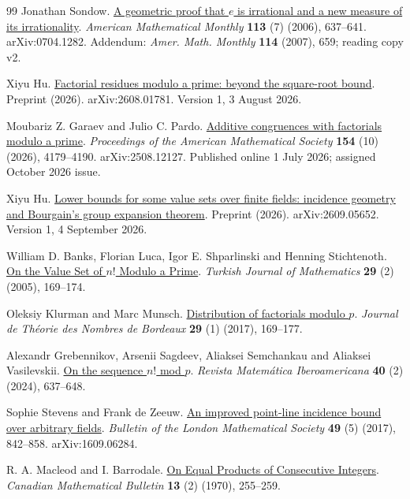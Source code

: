 \documentclass[11pt]{article}
\begin{document}
\begin{thebibliography}{99}
Jonathan Sondow. \href{https://arxiv.org/abs/0704.1282v2}{A geometric proof that {$e$} is irrational and a new measure of its irrationality}.
\emph{American Mathematical Monthly} \textbf{113} (7) (2006), 637--641. arXiv:0704.1282. Addendum: \emph{Amer. Math. Monthly} \textbf{114} (2007), 659; reading copy v2.

Xiyu Hu. \href{https://arxiv.org/abs/2608.01781v1}{Factorial residues modulo a prime: beyond the square-root bound}.
Preprint (2026). arXiv:2608.01781. Version 1, 3 August 2026.

Moubariz Z. Garaev and Julio C. Pardo. \href{https://doi.org/10.1090/proc/17753}{Additive congruences with factorials modulo a prime}.
\emph{Proceedings of the American Mathematical Society} \textbf{154} (10) (2026), 4179--4190. arXiv:2508.12127. Published online 1 July 2026; assigned October 2026 issue.

Xiyu Hu. \href{https://arxiv.org/abs/2609.05652v1}{Lower bounds for some value sets over finite fields: incidence geometry and {Bourgain}'s group expansion theorem}.
Preprint (2026). arXiv:2609.05652. Version 1, 4 September 2026.

William D. Banks, Florian Luca, Igor E. Shparlinski and Henning Stichtenoth. \href{https://journals.tubitak.gov.tr/math/vol29/iss2/6/}{On the Value Set of $n!$ Modulo a Prime}.
\emph{Turkish Journal of Mathematics} \textbf{29} (2) (2005), 169--174.

Oleksiy Klurman and Marc Munsch. \href{https://doi.org/10.5802/jtnb.974}{Distribution of factorials modulo $p$}.
\emph{Journal de Théorie des Nombres de Bordeaux} \textbf{29} (1) (2017), 169--177.

Alexandr Grebennikov, Arsenii Sagdeev, Aliaksei Semchankau and Aliaksei Vasilevskii. \href{https://doi.org/10.4171/RMI/1422}{On the sequence $n!$ mod $p$}.
\emph{Revista Matemática Iberoamericana} \textbf{40} (2) (2024), 637--648.

Sophie Stevens and Frank de Zeeuw. \href{https://doi.org/10.1112/blms.12077}{An improved point-line incidence bound over arbitrary fields}.
\emph{Bulletin of the London Mathematical Society} \textbf{49} (5) (2017), 842--858. arXiv:1609.06284.

R. A. Macleod and I. Barrodale. \href{https://doi.org/10.4153/CMB-1970-052-8}{On Equal Products of Consecutive Integers}.
\emph{Canadian Mathematical Bulletin} \textbf{13} (2) (1970), 255--259.


\end{thebibliography}
\end{document}
